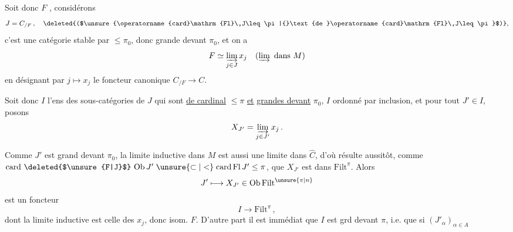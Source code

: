 Soit donc $F$  ,  considérons
\[ J=C_{/F}\,,\quad \text{\deleted{($\unsure{\operatorname{card}\mathrm{Fl}\,J\leq\pi|{}\text{de }\operatorname{card}\mathrm{Fl}\,J\leq\pi}$)}}, \]
c'est une catégorie stable par   $\leq\pi_0$, donc grande devant $\pi_0$, et on a
\[ F\simeq\varinjlim_{j\in J}x_j\quad(\varinjlim\text{ dans }M) \]
en désignant par $j\longmapsto x_j$ le foncteur canonique $C_{/F}\longrightarrow C$.

Soit donc $I$ l'ens des sous-catégories  de $J$ qui sont \uline{de cardinal} $\leq\pi$ \uline{et} \uline{grandes devant} $\pi_0$, $I$ ordonné par inclusion, et pour tout $J'\in I$, posons
\[ X_{J'}=\varinjlim_{j\in J'}x_j\,. \]
  

Comme $J'$ est grand devant $\pi_0$, la limite inductive dans $M$ est aussi une limite dans $\widehat C$, d'où résulte  aussitôt, comme $\operatorname{card}\,\text{\deleted{$\unsure{F|J}$}}\,\operatorname{Ob} J'\mathrel{\unsure{\subset|<}}\operatorname{card}\mathrm{Fl}\,J'\leq\pi$, que $X_{J'}$ est dans $\mathrm{Filt}^\pi$. Alors
\[ J'\longmapsto X_{J'}\in\operatorname{Ob}\mathrm{Filt}^{\unsure{\pi|n}} \]
est un foncteur
\[ I\longrightarrow\mathrm{Filt}^\pi\,, \]
dont la limite inductive est celle des $x_j$, donc isom.  $F$. D'autre part il est immédiat que $I$ est grd devant $\pi$, i.e. que si $(J'_\alpha)_{\alpha\in A}$ 
